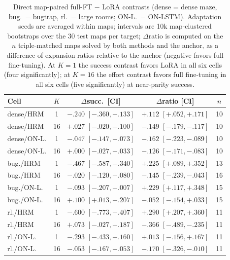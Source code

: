 \documentclass[letterpaper]{article} %
\begin{document}
\begin{table}[t]
\centering
\small
\setlength{\tabcolsep}{2.2pt}
\begin{tabular}{@{}lccc c@{}}
\toprule
Cell & $K$ & $\Delta$succ.\ [CI] & $\Delta$ratio [CI] & $n$ \\
\midrule
dense/HRM & 1 & $-.240$ $[-.360,-.133]$ & $+.112$ $[+.052,+.171]$ & 10 \\
dense/HRM & 16 & $+.027$ $[-.020,+.100]$ & $-.149$ $[-.179,-.117]$ & 10 \\
dense/ON-L. & 1 & $-.047$ $[-.147,+.073]$ & $-.162$ $[-.223,-.089]$ & 10 \\
dense/ON-L. & 16 & $+.000$ $[-.027,+.033]$ & $-.126$ $[-.171,-.083]$ & 10 \\
bug./HRM & 1 & $-.467$ $[-.587,-.340]$ & $+.225$ $[+.089,+.352]$ & 13 \\
bug./HRM & 16 & $-.020$ $[-.120,+.080]$ & $-.145$ $[-.239,-.043]$ & 16 \\
bug./ON-L. & 1 & $-.093$ $[-.207,+.007]$ & $+.229$ $[+.117,+.348]$ & 15 \\
bug./ON-L. & 16 & $+.100$ $[+.013,+.207]$ & $-.052$ $[-.154,+.033]$ & 15 \\
rl./HRM & 1 & $-.600$ $[-.773,-.407]$ & $+.290$ $[+.207,+.360]$ & 11 \\
rl./HRM & 16 & $+.073$ $[-.027,+.187]$ & $-.366$ $[-.489,-.235]$ & 11 \\
rl./ON-L. & 1 & $-.293$ $[-.433,-.160]$ & $+.013$ $[-.156,+.167]$ & 11 \\
rl./ON-L. & 16 & $-.053$ $[-.167,+.053]$ & $-.170$ $[-.326,-.010]$ & 11 \\
\bottomrule
\end{tabular}
\caption{Direct map-paired full-FT $-$ LoRA contrasts (dense = dense maze, bug.\ = bugtrap, rl.\ = large rooms; ON-L.\ = ON-LSTM). Adaptation seeds are averaged within maps; intervals are 10k map-clustered bootstraps over the 30 test maps per target; $\Delta$ratio is computed on the $n$ triple-matched maps solved by both methods and the anchor, as a difference of expansion ratios relative to the anchor (negative favors full fine-tuning). At $K{=}1$ the success contrast favors LoRA in all six cells (four significantly); at $K{=}16$ the effort contrast favors full fine-tuning in all six cells (five significantly) at near-parity success.}
\label{tab:directcontrast}
\end{table}
\end{document}
